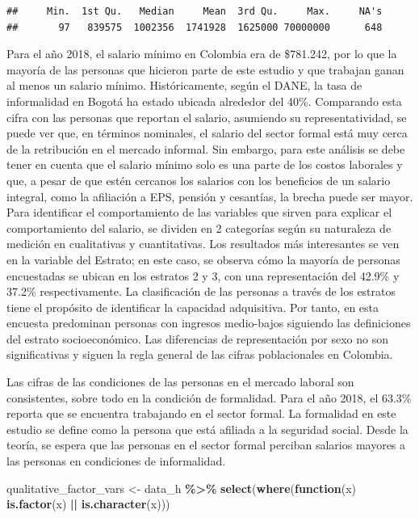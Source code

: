 \documentclass[
]{article}
\newenvironment{Shaded}{\begin{snugshade}}{\end{snugshade}}
\newcommand{\ControlFlowTok}[1]{\textcolor[rgb]{0.13,0.29,0.53}{\textbf{#1}}}
\newcommand{\FunctionTok}[1]{\textcolor[rgb]{0.13,0.29,0.53}{\textbf{#1}}}
\newcommand{\NormalTok}[1]{#1}
\newcommand{\OtherTok}[1]{\textcolor[rgb]{0.56,0.35,0.01}{#1}}
\newcommand{\SpecialCharTok}[1]{\textcolor[rgb]{0.81,0.36,0.00}{\textbf{#1}}}
\begin{document}
\begin{verbatim}
##     Min.  1st Qu.   Median     Mean  3rd Qu.     Max.     NA's 
##       97   839575  1002356  1741928  1625000 70000000      648
\end{verbatim}

Para el año 2018, el salario mínimo en Colombia era de \$781.242, por lo
que la mayoría de las personas que hicieron parte de este estudio y que
trabajan ganan al menos un salario mínimo. Históricamente, según el
DANE, la tasa de informalidad en Bogotá ha estado ubicada alrededor del
40\%. Comparando esta cifra con las personas que reportan el salario,
asumiendo su representatividad, se puede ver que, en términos nominales,
el salario del sector formal está muy cerca de la retribución en el
mercado informal. Sin embargo, para este análisis se debe tener en
cuenta que el salario mínimo solo es una parte de los costos laborales y
que, a pesar de que estén cercanos los salarios con los beneficios de un
salario integral, como la afiliación a EPS, pensión y cesantías, la
brecha puede ser mayor. Para identificar el comportamiento de las
variables que sirven para explicar el comportamiento del salario, se
dividen en 2 categorías según su naturaleza de medición en cualitativas
y cuantitativas. Los resultados más interesantes se ven en la variable
del Estrato; en este caso, se observa cómo la mayoría de personas
encuestadas se ubican en los estratos 2 y 3, con una representación del
42.9\% y 37.2\% respectivamente. La clasificación de las personas a
través de los estratos tiene el propósito de identificar la capacidad
adquisitiva. Por tanto, en esta encuesta predominan personas con
ingresos medio-bajos siguiendo las definiciones del estrato
socioeconómico. Las diferencias de representación por sexo no son
significativas y siguen la regla general de las cifras poblacionales en
Colombia.

Las cifras de las condiciones de las personas en el mercado laboral son
consistentes, sobre todo en la condición de formalidad. Para el año
2018, el 63.3\% reporta que se encuentra trabajando en el sector formal.
La formalidad en este estudio se define como la persona que está
afiliada a la seguridad social. Desde la teoría, se espera que las
personas en el sector formal perciban salarios mayores a las personas en
condiciones de informalidad.

\begin{Shaded}
\begin{Highlighting}[]
\NormalTok{qualitative\_factor\_vars }\OtherTok{\textless{}{-}}\NormalTok{ data\_h }\SpecialCharTok{\%\textgreater{}\%}
  \FunctionTok{select}\NormalTok{(}\FunctionTok{where}\NormalTok{(}\ControlFlowTok{function}\NormalTok{(x) }\FunctionTok{is.factor}\NormalTok{(x) }\SpecialCharTok{||} \FunctionTok{is.character}\NormalTok{(x))) }
\end{Highlighting}
\end{Shaded}
\end{document}

